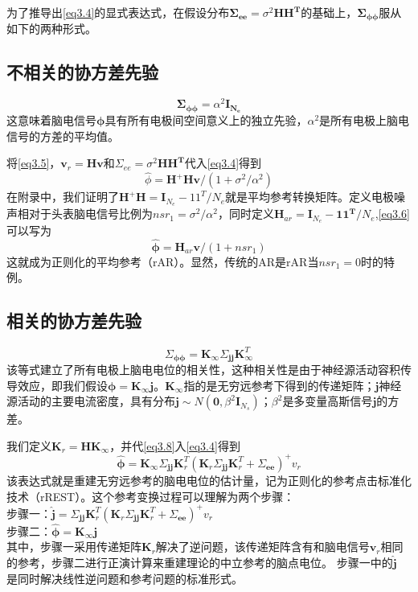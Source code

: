 为了推导出\eqref{eq3.4}的显式表达式，在假设分布$\mathbf{\Sigma_{ee}}=\sigma^{2}\mathbf{HH^T}$的基础上，$\mathbf{\Sigma_{\phi\phi}}$服从如下的两种形式。
\subsection{不相关的协方差先验}
\begin{equation}\label{eq3.5}
\mathbf{\Sigma_{\phi\phi}}=\alpha^{2}\mathbf{I_{N_{e}}}
\end{equation}
这意味着脑电信号$\mathbf{\phi}$具有所有电极间空间意义上的独立先验，$\alpha^{2}$是所有电极上脑电信号的方差的平均值。

将\eqref{eq3.5}，$\mathbf{v}_{r}=\mathbf{Hv}$和$\Sigma_{ee}=\sigma^{2}\mathbf{HH^{T}}$代入\eqref{eq3.4}得到
\begin{equation}\label{eq3.6}
\hat{\phi}=\mathbf{H^{+}Hv}/(1+\sigma^{2}/{\alpha^{2}})
\end{equation}
在附录中，我们证明了$\mathbf{H^+H}=\mathbf{I}_{N_e}-11^T/N_e$就是平均参考转换矩阵。定义电极噪声相对于头表脑电信号比例为$nsr_1=\sigma^2/\alpha^2$，同时定义$\mathbf{H}_{ar}=\mathbf{I}_{N_e}-\mathbf{11^T}/{N_e}$,\eqref{eq3.6}可以写为
\begin{equation}\label{eq3.7}
\hat{\mathbf{\phi}}=\mathbf{H}_{ar}\mathbf{v}/(1+nsr_1)
\end{equation}
这就成为正则化的平均参考（rAR）。显然，传统的AR是rAR当$nsr_1=0$时的特例。
\subsection{相关的协方差先验}
\begin{equation}\label{eq3.8}
\Sigma_{\mathbf{\phi\phi}}=\mathbf{K}_{\infty}\Sigma_{\mathbf{jj}}\mathbf{K}_{\infty}^T
\end{equation}
该等式建立了所有电极上脑电电位的相关性，这种相关性是由于神经源活动容积传导效应，即我们假设$\mathbf{\phi}=\mathbf{K}_{\infty}\mathbf{j}$。$\mathbf{K}_\infty$指的是无穷远参考下得到的传递矩阵；$\mathbf{j}$神经源活动的主要电流密度，具有分布$\mathbf{j}\sim{N(\mathbf{0},\beta^2\mathbf{I}_{N_s})}$；$\beta^{2}$是多变量高斯信号$\mathbf{j}$的方差。

我们定义$\mathbf{K}_{r}=\mathbf{HK}_{\infty}$，并代\eqref{eq3.8}入\eqref{eq3.4}得到
\begin{equation}\label{eq3.9}
\hat{\mathbf{\phi}}=\mathbf{K}_\infty\Sigma_{\mathbf{jj}}\mathbf{K}_r^T(\mathbf{K}_r\Sigma_{\mathbf{jj}}\mathbf{K}_r^T+\Sigma_{\mathbf{ee}})^+v_r
\end{equation}
该表达式就是重建无穷远参考的脑电电位的估计量，记为正则化的参考点击标准化技术（rREST）。这个参考变换过程可以理解为两个步骤：\\
步骤一：$\hat{\mathbf{j}}=\Sigma_{\mathbf{jj}}\mathbf{K}_{r}^T(\mathbf{K}_{r}\Sigma_{\mathbf{jj}}\mathbf{K}_r^T+\Sigma_{\mathbf{ee}})^+v_r$\\
步骤二：$\hat{\mathbf{\phi}}=\mathbf{K}_{\infty}\mathbf{j}$\\
其中，步骤一采用传递矩阵$\mathbf{K}_{r}$解决了逆问题，该传递矩阵含有和脑电信号$\mathbf{v}_{r}$相同的参考，步骤二进行正演计算来重建理论的中立参考的脑点电位。 步骤一中的$\hat{\mathbf{j}}$ 是同时解决线性逆问题和参考问题的标准形式。

